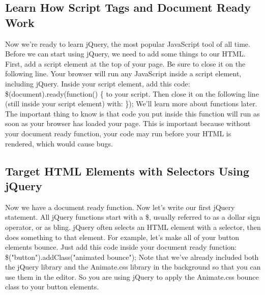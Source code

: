 \documentclass{article}%
\begin{document}
\subsection{Learn How Script Tags and Document Ready Work}%
\label{subsec:LearnHowScriptTagsandDocumentReadyWork}%
Now we're ready to learn jQuery, the most popular JavaScript tool of all time.\newline%
Before we can start using jQuery, we need to add some things to our HTML.\newline%
First, add a script element at the top of your page. Be sure to close it on the following line.\newline%
Your browser will run any JavaScript inside a script element, including jQuery.\newline%
Inside your script element, add this code: \$(document).ready(function() \{ to your script. Then close it on the following line (still inside your script element) with: \});\newline%
We'll learn more about functions later. The important thing to know is that code you put inside this function will run as soon as your browser has loaded your page.\newline%
This is important because without your document ready function, your code may run before your HTML is rendered, which would cause bugs.\newline%

%
\subsection{Target HTML Elements with Selectors Using jQuery}%
\label{subsec:TargetHTMLElementswithSelectorsUsingjQuery}%
Now we have a document ready function.\newline%
Now let's write our first jQuery statement. All jQuery functions start with a \$, usually referred to as a dollar sign operator, or as bling.\newline%
jQuery often selects an HTML element with a selector, then does something to that element.\newline%
For example, let's make all of your button elements bounce. Just add this code inside your document ready function:\newline%
\$("button").addClass("animated bounce");\newline%
Note that we've already included both the jQuery library and the Animate.css library in the background so that you can use them in the editor. So you are using jQuery to apply the Animate.css bounce class to your button elements.\newline%
\end{document}

